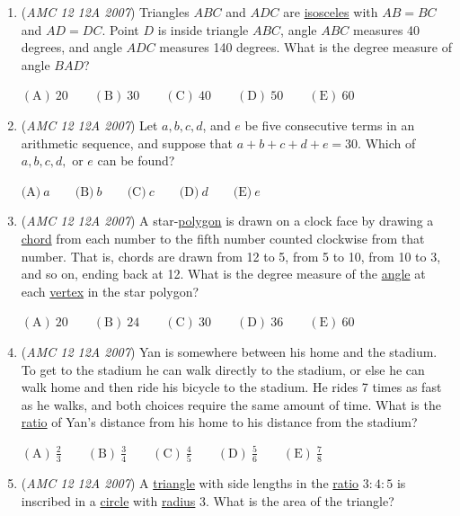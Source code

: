 \begin{enumerate}
	\item (\textit{AMC 12 12A 2007}) Triangles $ABC$ and $ADC$ are \href{https://artofproblemsolving.com/wiki/index.php?title=Isosceles}{isosceles} with $AB=BC$ and $AD=DC$. Point $D$ is inside triangle $ABC$, angle $ABC$ measures 40 degrees, and angle $ADC$ measures 140 degrees. What is the degree measure of angle $BAD$?


 $\mathrm{(A)}\ 20\qquad \mathrm{(B)}\ 30\qquad \mathrm{(C)}\ 40\qquad \mathrm{(D)}\ 50\qquad \mathrm{(E)}\ 60$


	\item (\textit{AMC 12 12A 2007}) Let $a, b, c, d$, and $e$ be five consecutive terms in an arithmetic sequence, and suppose that $a+b+c+d+e=30$. Which of $a, b, c, d,$ or $e$ can be found?


 $\textrm{(A)} \ a\qquad \textrm{(B)}\ b\qquad \textrm{(C)}\ c\qquad \textrm{(D)}\ d\qquad \textrm{(E)}\ e$


	\item (\textit{AMC 12 12A 2007}) A star-\href{https://artofproblemsolving.com/wiki/index.php?title=Polygon}{polygon} is drawn on a clock face by drawing a \href{https://artofproblemsolving.com/wiki/index.php?title=Chord}{chord} from each number to the fifth number counted clockwise from that number. That is, chords are drawn from 12 to 5, from 5 to 10, from 10 to 3, and so on, ending back at 12. What is the degree measure of the \href{https://artofproblemsolving.com/wiki/index.php?title=Angle}{angle} at each \href{https://artofproblemsolving.com/wiki/index.php?title=Vertex}{vertex} in the star polygon?


 $\mathrm{(A)}\ 20\qquad \mathrm{(B)}\ 24\qquad \mathrm{(C)}\ 30\qquad \mathrm{(D)}\ 36\qquad \mathrm{(E)}\ 60$


	\item (\textit{AMC 12 12A 2007}) Yan is somewhere between his home and the stadium. To get to the stadium he can walk directly to the stadium, or else he can walk home and then ride his bicycle to the stadium. He rides 7 times as fast as he walks, and both choices require the same amount of time. What is the \href{https://artofproblemsolving.com/wiki/index.php?title=Ratio}{ratio} of Yan's distance from his home to his distance from the stadium?


 $\mathrm{(A)}\ \frac 23\qquad \mathrm{(B)}\ \frac 34\qquad \mathrm{(C)}\ \frac 45\qquad \mathrm{(D)}\ \frac 56\qquad \mathrm{(E)}\ \frac 78$


	\item (\textit{AMC 12 12A 2007}) A \href{https://artofproblemsolving.com/wiki/index.php?title=Triangle}{triangle} with side lengths in the \href{https://artofproblemsolving.com/wiki/index.php?title=Ratio}{ratio} $3 : 4 : 5$ is inscribed in a \href{https://artofproblemsolving.com/wiki/index.php?title=Circle}{circle} with \href{https://artofproblemsolving.com/wiki/index.php?title=Radius}{radius} 3. What is the area of the triangle?



\end{enumerate}
